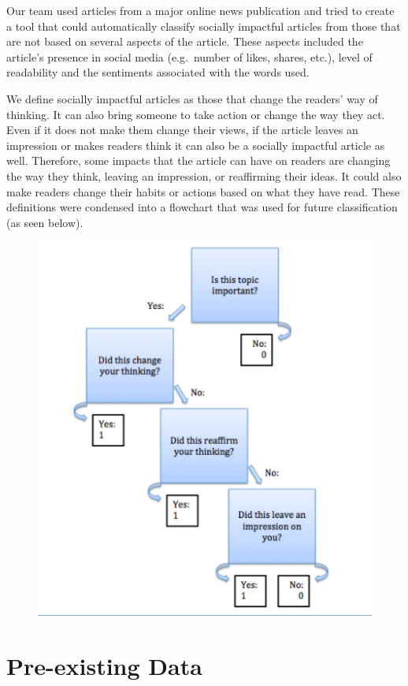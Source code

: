 \documentclass[10pt,letterpaper]{article}
\begin{document}
Our team used articles from a major online news publication and tried to
create a tool that could automatically classify socially impactful
articles from those that are not based on several aspects of the
article. These aspects included the article's presence in social media
(e.g.~number of likes, shares, etc.), level of readability and the
sentiments associated with the words used.

We define socially impactful articles as those that change the readers'
way of thinking. It can also bring someone to take action or change the
way they act. Even if it does not make them change their views, if the
article leaves an impression or makes readers think it can also be a
socially impactful article as well. Therefore, some impacts that the
article can have on readers are changing the way they think, leaving an
impression, or reaffirming their ideas. It could also make readers
change their habits or actions based on what they have read. These
definitions were condensed into a flowchart that was used for future
classification (as seen below).

\begin{figure}
\centering
\includegraphics{tree.png}
\caption{}
\end{figure}

\section{Pre-existing Data}\label{pre-existing-data}
\end{document}
